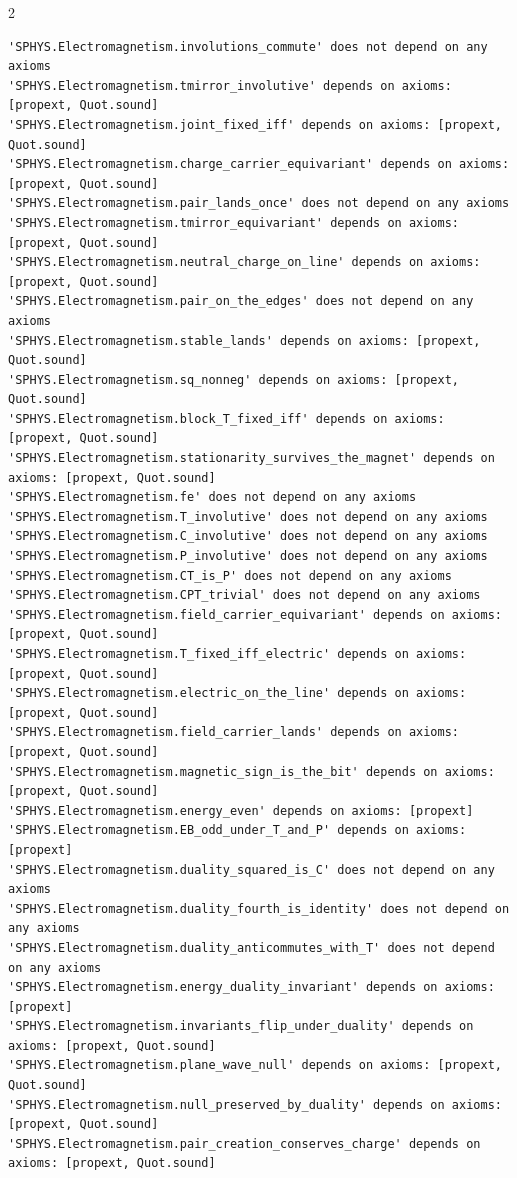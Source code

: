 \documentclass[10pt]{article}
\begin{document}
\begin{multicols}{2}
\begin{Verbatim}[fontsize=\fontsize{6.0}{6.9}\selectfont,breaklines,breakanywhere,breaksymbolleft={}]
'SPHYS.Electromagnetism.involutions_commute' does not depend on any axioms
'SPHYS.Electromagnetism.tmirror_involutive' depends on axioms: [propext, Quot.sound]
'SPHYS.Electromagnetism.joint_fixed_iff' depends on axioms: [propext, Quot.sound]
'SPHYS.Electromagnetism.charge_carrier_equivariant' depends on axioms: [propext, Quot.sound]
'SPHYS.Electromagnetism.pair_lands_once' does not depend on any axioms
'SPHYS.Electromagnetism.tmirror_equivariant' depends on axioms: [propext, Quot.sound]
'SPHYS.Electromagnetism.neutral_charge_on_line' depends on axioms: [propext, Quot.sound]
'SPHYS.Electromagnetism.pair_on_the_edges' does not depend on any axioms
'SPHYS.Electromagnetism.stable_lands' depends on axioms: [propext, Quot.sound]
'SPHYS.Electromagnetism.sq_nonneg' depends on axioms: [propext, Quot.sound]
'SPHYS.Electromagnetism.block_T_fixed_iff' depends on axioms: [propext, Quot.sound]
'SPHYS.Electromagnetism.stationarity_survives_the_magnet' depends on axioms: [propext, Quot.sound]
'SPHYS.Electromagnetism.fe' does not depend on any axioms
'SPHYS.Electromagnetism.T_involutive' does not depend on any axioms
'SPHYS.Electromagnetism.C_involutive' does not depend on any axioms
'SPHYS.Electromagnetism.P_involutive' does not depend on any axioms
'SPHYS.Electromagnetism.CT_is_P' does not depend on any axioms
'SPHYS.Electromagnetism.CPT_trivial' does not depend on any axioms
'SPHYS.Electromagnetism.field_carrier_equivariant' depends on axioms: [propext, Quot.sound]
'SPHYS.Electromagnetism.T_fixed_iff_electric' depends on axioms: [propext, Quot.sound]
'SPHYS.Electromagnetism.electric_on_the_line' depends on axioms: [propext, Quot.sound]
'SPHYS.Electromagnetism.field_carrier_lands' depends on axioms: [propext, Quot.sound]
'SPHYS.Electromagnetism.magnetic_sign_is_the_bit' depends on axioms: [propext, Quot.sound]
'SPHYS.Electromagnetism.energy_even' depends on axioms: [propext]
'SPHYS.Electromagnetism.EB_odd_under_T_and_P' depends on axioms: [propext]
'SPHYS.Electromagnetism.duality_squared_is_C' does not depend on any axioms
'SPHYS.Electromagnetism.duality_fourth_is_identity' does not depend on any axioms
'SPHYS.Electromagnetism.duality_anticommutes_with_T' does not depend on any axioms
'SPHYS.Electromagnetism.energy_duality_invariant' depends on axioms: [propext]
'SPHYS.Electromagnetism.invariants_flip_under_duality' depends on axioms: [propext, Quot.sound]
'SPHYS.Electromagnetism.plane_wave_null' depends on axioms: [propext, Quot.sound]
'SPHYS.Electromagnetism.null_preserved_by_duality' depends on axioms: [propext, Quot.sound]
'SPHYS.Electromagnetism.pair_creation_conserves_charge' depends on axioms: [propext, Quot.sound]

\end{Verbatim}
\end{multicols}
\end{document}
